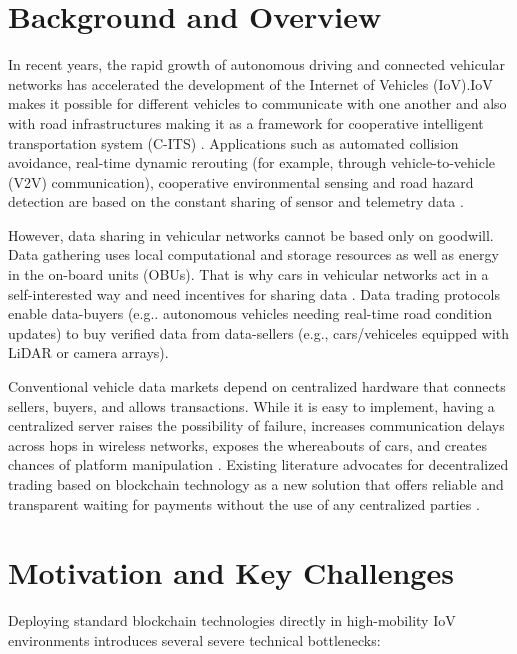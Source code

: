 \section{Background and Overview}\label{sec:intro_background}
\noindent In recent years, the rapid growth of autonomous driving and connected vehicular networks has accelerated the development of the Internet of Vehicles (IoV).IoV makes it possible for different vehicles to communicate with one another and also with road infrastructures making it as a framework for cooperative intelligent transportation system (C-ITS) \cite{chen2025lbdt}. Applications such as automated collision avoidance, real-time dynamic rerouting (for example, through vehicle-to-vehicle (V2V) communication), cooperative environmental sensing and road hazard detection are based on the constant sharing of sensor and telemetry data \cite{javaid2020scalable}.

However, data sharing in vehicular networks cannot be based only on goodwill. Data gathering uses local computational and storage resources as well as energy in the on-board units (OBUs). That is why cars in vehicular networks act in a self-interested way and need incentives for sharing data \cite{kang2019toward}. Data trading protocols enable data-buyers (e.g.. autonomous vehicles needing real-time road condition updates) to buy verified data from data-sellers (e.g., cars/vehiceles equipped with LiDAR or camera arrays).

Conventional vehicle data markets depend on centralized hardware that connects sellers, buyers, and allows transactions. While it is easy to implement, having a centralized server raises the possibility of failure, increases communication delays across hops in wireless networks, exposes the whereabouts of cars, and creates chances of platform manipulation \cite{michelin2018speedychain}. Existing literature advocates for decentralized trading based on blockchain technology as a new solution that offers reliable and transparent waiting for payments without the use of any centralized parties \cite{liu2018computation, firdaus2021blockchain}.

\section{Motivation and Key Challenges}\label{sec:intro_motivation}
\noindent Deploying standard blockchain technologies directly in high-mobility IoV environments introduces several severe technical bottlenecks:


